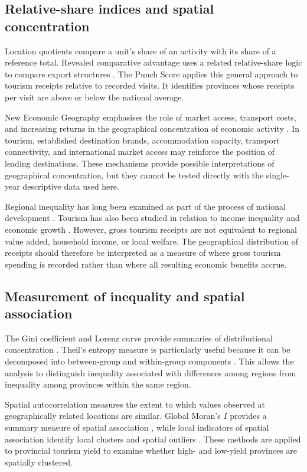 \documentclass[11pt,a4paper]{article}
\begin{document}
\subsection{Relative-share indices and spatial concentration}
Location quotients compare a unit's share of an activity with its share of a reference total. Revealed comparative advantage uses a related relative-share logic to compare export structures \citep{isard1960,balassa1965}. The Punch Score applies this general approach to tourism receipts relative to recorded visits. It identifies provinces whose receipts per visit are above or below the national average.

New Economic Geography emphasises the role of market access, transport costs, and increasing returns in the geographical concentration of economic activity \citep{krugman1991}. In tourism, established destination brands, accommodation capacity, transport connectivity, and international market access may reinforce the position of leading destinations. These mechanisms provide possible interpretations of geographical concentration, but they cannot be tested directly with the single-year descriptive data used here.

Regional inequality has long been examined as part of the process of national development \citep{williamson1965}. Tourism has also been studied in relation to income inequality and economic growth \citep{alam2016,balaguer2002,brida2016}. However, gross tourism receipts are not equivalent to regional value added, household income, or local welfare. The geographical distribution of receipts should therefore be interpreted as a measure of where gross tourism spending is recorded rather than where all resulting economic benefits accrue.

\subsection{Measurement of inequality and spatial association}
The Gini coefficient and Lorenz curve provide summaries of distributional concentration \citep{cowell2011}. Theil's entropy measure is particularly useful because it can be decomposed into between-group and within-group components \citep{theil1967,shorrocks1980}. This allows the analysis to distinguish inequality associated with differences among regions from inequality among provinces within the same region.

Spatial autocorrelation measures the extent to which values observed at geographically related locations are similar. Global Moran's $I$ provides a summary measure of spatial association \citep{moran1950}, while local indicators of spatial association identify local clusters and spatial outliers \citep{anselin1995}. These methods are applied to provincial tourism yield to examine whether high- and low-yield provinces are spatially clustered.
\end{document}
